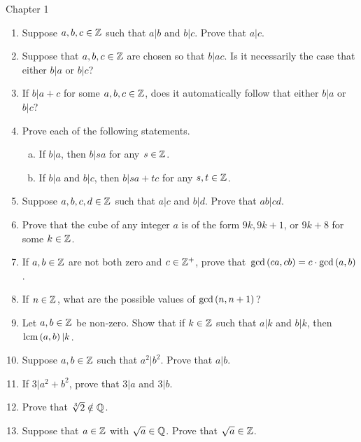 \documentclass[11pt,fleqn,dvipsnames,usenames]{article}
\renewcommand{\headrulewidth}{1pt}
\begin{document}
\fancyhead[L]{\course}
\fancyhead[R]{\term}
\renewcommand{\headrulewidth}{0.4pt}

{\huge Chapter 1}
\vsp

\begin{enumerate}
\item Suppose $a,b,c\in\mathbb{Z}$ such that $a|b$ and $b|c$.  Prove that $a|c$.
\item Suppose that $a,b,c\in\mathbb{Z}$ are chosen so that $b|ac$.  Is it necessarily the case that either $b|a$ or $b|c$?
\item If $b|a+c$ for some $a,b,c\in \mathbb{Z}$, does it automatically follow that either $b|a$ or $b|c$?
\item Prove each of the following statements.
\begin{enumerate}[(a)]
\item If $b|a$, then $b|sa$ for any $s\in\mathbb{Z}$.
\item If $b|a$ and $b|c$, then $b|sa+tc$ for any $s,t\in\mathbb{Z}$.
\end{enumerate}
\item Suppose $a,b,c,d\in\mathbb{Z}$ such that $a|c$ and $b|d$.  Prove that $ab|cd$.
\item Prove that the cube of any integer $a$ is of the form $9k, 9k+1$, or $9k+8$ for some $k\in\mathbb{Z}$.
\item If $a,b\in\mathbb{Z}$ are not both zero and $c\in\mathbb{Z}^{+}$, prove that $\text{gcd}\left(ca,cb\right) = c\cdot \text{gcd}\left(a,b\right)$.
\item If $n\in \mathbb{Z}$, what are the possible values of $\text{gcd}\left(n, n+1\right)$?
\item Let $a,b\in\mathbb{Z}$ be non-zero.  Show that if $k\in\mathbb{Z}$ such that $a|k$ and $b|k$, then $\text{lcm}\left(a, b\right)|k$.
\item Suppose $a,b\in\mathbb{Z}$ such that $a^2|b^2$.  Prove that $a|b$.
\item If $3|a^2 + b^2$, prove that $3|a$ and $3|b$.
\item Prove that $\sqrt[3]{2}\notin\mathbb{Q}$.
\item Suppose that $a\in\mathbb{Z}$ with $\sqrt{a}\in \mathbb{Q}$.  Prove that $\sqrt{a}\in\mathbb{Z}$.
\end{enumerate}
\vsp
\end{document}
